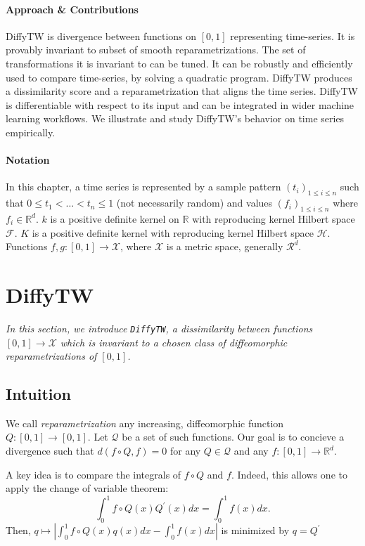 \paragraph{Approach \& Contributions}
DiffyTW is divergence between functions on $[0,1]$ representing time-series. It is provably invariant to subset of smooth reparametrizations. The set of transformations it is invariant to can be tuned. It can be robustly and efficiently used to compare time-series, by solving a quadratic program. DiffyTW produces a dissimilarity score and a reparametrization that aligns the time series. DiffyTW is differentiable with respect to its input and can be integrated in wider machine learning workflows. We illustrate and study DiffyTW's behavior on time series empirically.

\paragraph{Notation} In this chapter, a time series is represented by a sample pattern $(t_i)_{1 \leq i \leq n}$ such that $0 \leq t_1 < \ldots < t_n \leq 1$ (not necessarily random) and values $(f_i)_{1\leq i\leq n}$ where $f_i \in\mathbb R^d$. $k$ is a positive definite kernel on $\mathbb R$ with reproducing kernel Hilbert space $\mathcal F$. $K$ is a positive definite kernel with reproducing kernel Hilbert space $\mathcal H$. Functions $f,g:[0,1] \to \mathcal X$, where $\mathcal X$ is a metric space, generally $\mathcal R^d$.

\section{DiffyTW}
\emph{In this section, we introduce \texttt{DiffyTW}, a dissimilarity between functions $[0,1] \to \mathcal X$ which is invariant to a chosen class of diffeomorphic reparametrizations of $[0,1]$.}

\subsection{Intuition}
We call \emph{reparametrization} any increasing, diffeomorphic function $Q:[0,1] \to [0,1]$. Let $\mathcal Q$ be a set of such functions. Our goal is to concieve a divergence such that $d(f\circ Q, f) = 0$ for any $Q\in\mathcal Q$ and any $f:[0,1] \to \mathbb R^d$.

A key idea is to compare the integrals of $f\circ Q$ and $f$. Indeed, this allows one to apply the change of variable theorem:
\begin{equation}
\int_0^1 f\circ Q(x)Q^\prime(x)dx = \int_0^1 f(x)dx.
\end{equation}
Then,
$q \mapsto \left\vert\int_0^1 f\circ Q(x)q(x) dx - \int_0^1 f(x)dx\right\vert$
is minimized by $q=Q^\prime$

